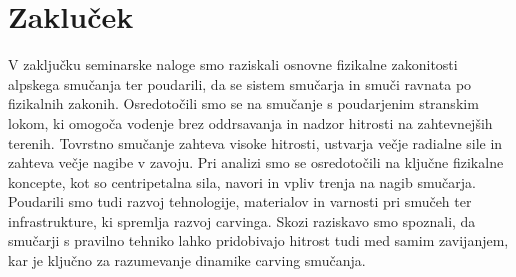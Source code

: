 \documentclass{article}
\begin{document}
\section{Zakluček}
V zaključku seminarske naloge smo raziskali osnovne fizikalne zakonitosti alpskega smučanja ter poudarili, da se sistem smučarja in smuči ravnata po fizikalnih zakonih. Osredotočili smo se na smučanje s poudarjenim stranskim lokom, ki omogoča vodenje brez oddrsavanja in nadzor hitrosti na zahtevnejših terenih. Tovrstno smučanje zahteva visoke hitrosti, ustvarja večje radialne sile in zahteva večje nagibe v zavoju. Pri analizi smo se osredotočili na ključne fizikalne koncepte, kot so centripetalna sila, navori in vpliv trenja na nagib smučarja. Poudarili smo tudi razvoj tehnologije, materialov in varnosti pri smučeh ter infrastrukture, ki spremlja razvoj carvinga. Skozi raziskavo smo spoznali, da smučarji s pravilno tehniko lahko pridobivajo hitrost tudi med samim zavijanjem, kar je ključno za razumevanje dinamike carving smučanja.
\end{document}
